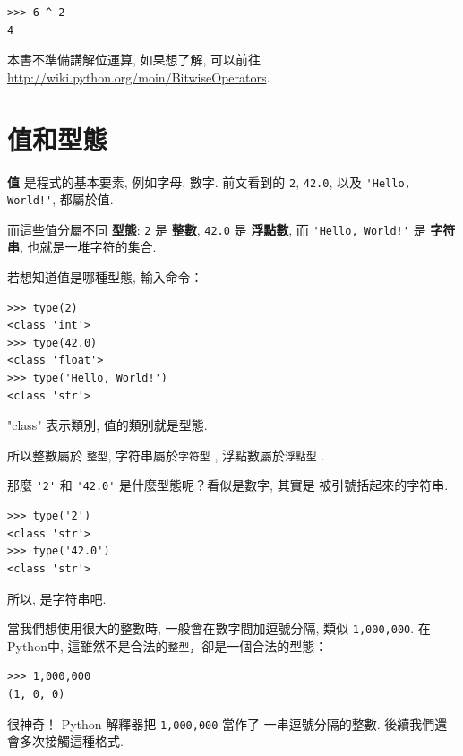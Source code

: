 \documentclass[10pt]{book}
\begin{document}
\begin{verbatim}
>>> 6 ^ 2
4
\end{verbatim}
%

本書不準備講解位運算, 如果想了解, 可以前往 
\url{http://wiki.python.org/moin/BitwiseOperators}. 


\section{值和型態}


 {\bf 值} 是程式的基本要素, 例如字母, 數字. 前文看到的
 {\tt 2}, {\tt 42.0}, 以及 \verb"'Hello, World!'", 都屬於值. 

而這些值分屬不同 {\bf 型態}:
{\tt 2} 是 {\bf 整數}, 
{\tt 42.0} 是 {\bf 浮點數}, 
而 \verb"'Hello, World!'" 是 {\bf 字符串}, 也就是一堆字符的集合. 

若想知道值是哪種型態, 輸入命令：

\begin{verbatim}
>>> type(2)
<class 'int'>
>>> type(42.0)
<class 'float'>
>>> type('Hello, World!')
<class 'str'>
\end{verbatim}
%

"class" 表示類別, 值的類別就是型態. 


所以整數屬於 {\tt 整型}, 字符串屬於{\tt 字符型} , 浮點數屬於{\tt 浮點型} . 

那麼 \verb"'2'" 和 \verb"'42.0'" 是什麼型態呢？看似是數字, 其實是
被引號括起來的字符串. 

\begin{verbatim}
>>> type('2')
<class 'str'>
>>> type('42.0')
<class 'str'>
\end{verbatim}
%
所以, 是字符串吧. 

當我們想使用很大的整數時, 一般會在數字間加逗號分隔, 類似 {\tt 1,000,000}. 
在Python中, 這雖然不是合法的{\tt 整型}，卻是一個合法的型態：

\begin{verbatim}
>>> 1,000,000
(1, 0, 0)
\end{verbatim}
%

很神奇！ Python 解釋器把 {\tt 1,000,000} 當作了
一串逗號分隔的整數. 後續我們還會多次接觸這種格式. 
\end{document}
